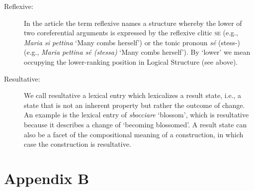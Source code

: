 \documentclass[output=paper,colorlinks,citecolor=brown
]{langscibook}
\begin{document}
\begin{description}
\item[Reflexive:]  In the article the term reflexive   names a structure whereby the lower of two coreferential arguments is   expressed by the reflexive clitic \textsc{se} (e.g.,   \textit{Maria si pettina} ‘Many combs herself’) or the tonic pronoun \textit{sé}   (stess-) (e.g., \textit{Maria pettina sé (stessa)} ‘Many combs herself’).   By ‘lower’ we mean occupying the lower-ranking position in Logical Structure   (see above).                              
\item[Resultative:]  We call resultative a   lexical entry which lexicalizes a result state, i.e., a state that is not an   inherent property but rather the outcome of change. An example is the lexical   entry of \textit{sbocciare} ‘blossom’, which is resultative because it   describes a change of ‘becoming blossomed’. A result state can also be a facet   of the compositional meaning of a construction, in which case the   construction is resultative. 
\end{description}


\section*{Appendix B}
\end{document}
